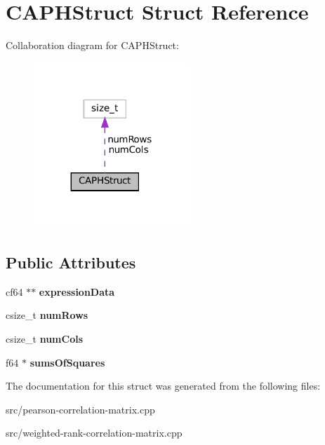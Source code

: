 \hypertarget{structCAPHStruct}{}\section{C\+A\+P\+H\+Struct Struct Reference}
\label{structCAPHStruct}


Collaboration diagram for C\+A\+P\+H\+Struct\+:\nopagebreak
\begin{figure}[H]
\begin{center}
\leavevmode
\includegraphics[width=167pt]{structCAPHStruct__coll__graph}
\end{center}
\end{figure}
\subsection*{Public Attributes}
\begin{DoxyCompactItemize}
\item 
\mbox{\label{structCAPHStruct_a76219a6222c8003950c5585143ebfc5b}} 
cf64 $\ast$$\ast$ {\bfseries expression\+Data}
\item 
\mbox{\label{structCAPHStruct_a6515a128c8b5c23c91b5014785591a3d}} 
csize\+\_\+t {\bfseries num\+Rows}
\item 
\mbox{\label{structCAPHStruct_a7f7c79a59b113eddd70e70b4712163b7}} 
csize\+\_\+t {\bfseries num\+Cols}
\item 
\mbox{\label{structCAPHStruct_ae431f8d57ef33b038493e9d549bbe133}} 
f64 $\ast$ {\bfseries sums\+Of\+Squares}
\end{DoxyCompactItemize}


The documentation for this struct was generated from the following files\+:\begin{DoxyCompactItemize}
\item 
src/pearson-\/correlation-\/matrix.\+cpp\item 
src/weighted-\/rank-\/correlation-\/matrix.\+cpp\end{DoxyCompactItemize}
